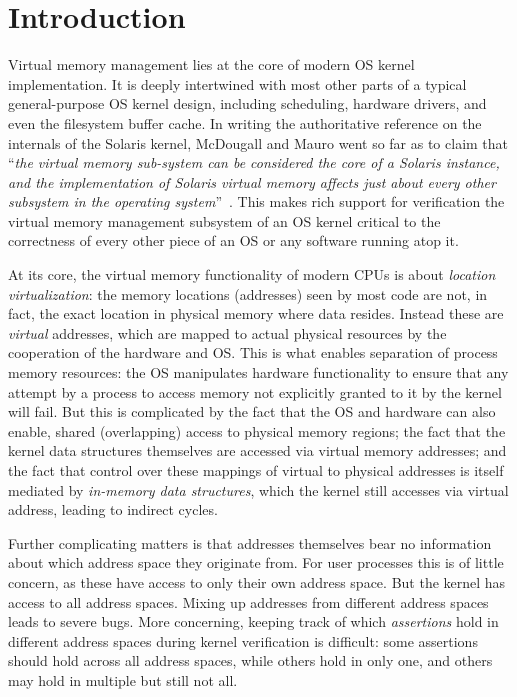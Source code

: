 \section{Introduction}
\label{sec:intro}
Virtual memory management lies at the core of modern OS kernel implementation. It is deeply intertwined with most other parts of a typical general-purpose OS kernel design, including scheduling, hardware drivers, and even the filesystem buffer cache. In writing the authoritative reference on the internals of the Solaris kernel, McDougall and Mauro went so far as to claim that ``\emph{the virtual memory sub-system can be considered the core of a Solaris instance, and the implementation of Solaris virtual memory affects just about every other subsystem in the operating system}''~\cite{mcdougall2006solaris}.
This makes rich support for verification the virtual memory management subsystem of an OS kernel critical to the correctness of every other piece of an OS or any software running atop it.

At its core, the virtual memory functionality of modern CPUs is about \emph{location virtualization}: the memory locations (addresses) seen by most code are not, in fact, the exact location in physical memory where data resides. Instead these are \emph{virtual} addresses, which are mapped to actual physical resources by the cooperation of the hardware and OS. This is what enables separation of process memory resources:
the OS manipulates hardware functionality to ensure that any attempt by a process to access memory not explicitly granted to it by the kernel will fail.
But this is complicated by the fact that the OS and hardware can also enable, shared (overlapping) access to physical memory regions; the fact that the kernel data structures themselves are accessed via virtual memory addresses; and the fact that control over these mappings of virtual to physical addresses is itself mediated by \emph{in-memory data structures}, which the kernel still accesses via virtual address, leading to indirect cycles.

Further complicating matters is that addresses themselves bear no information about which address space they originate from. For user processes this is of little concern, as these have access to only their own address space. But the kernel has access to all address spaces. Mixing up addresses from different address spaces leads to severe bugs. More concerning, keeping track of which \emph{assertions} hold in different address spaces during kernel verification is difficult: some assertions should hold across all address spaces, while others hold in only one, and others may hold in multiple but still not all.


